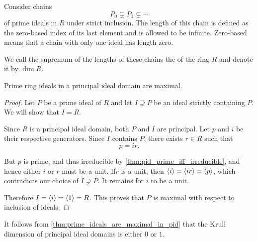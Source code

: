 \begin{definition}\label{def:krull_dimension}\cite[67]{Kocev2016}
  Consider chains
  \begin{equation*}
    P_0 \subsetneq P_1 \subsetneq \cdots
  \end{equation*}
  of prime ideals in \( R \) under strict inclusion. The length of this chain is defined as the zero-based index of its last element and is allowed to be infinite. Zero-based means that a chain with only one ideal has length zero.

  We call the supremum of the lengths of these chains the  of the ring \( R \) and denote it by \( \dim R \).
\end{definition}

\begin{proposition}\label{thm:prime_ideals_are_maximal_in_pid}
  Prime ring ideals in a principal ideal domain are maximal.
\end{proposition}
\begin{proof}
  Let \( P \) be a prime ideal of \( R \) and let \( I \supsetneq P \) be an ideal strictly containing \( P \). We will show that \( I = R \).

  Since \( R \) is a principal ideal domain, both \( P \) and \( I \) are principal. Let \( p \) and \( i \) be their respective generators. Since \( I \) contains \( P \), there exists \( r \in R \) such that
  \begin{equation*}
    p = ir.
  \end{equation*}

  But \( p \) is prime, and thus irreducible by \cref{thm:pid_prime_iff_irreducible}, and hence either \( i \) or \( r \) must be a unit. If\LEM \( r \) is a unit, then \( \left\langle i \right\rangle = \left\langle ir \right\rangle = \left\langle p \right\rangle \), which contradicts our choice of \( I \supsetneq P \). It remains for \( i \) to be a unit.

  Therefore \( I = \left\langle i \right\rangle = \left\langle 1 \right\rangle = R \). This proves that \( P \) is maximal with respect to inclusion of ideals.
\end{proof}

\begin{corollary}\label{thm:pid_krull_dimension}
  It follows from \cref{thm:prime_ideals_are_maximal_in_pid} that the Krull dimension of principal ideal domains is either \( 0 \) or \( 1 \).
\end{corollary}

